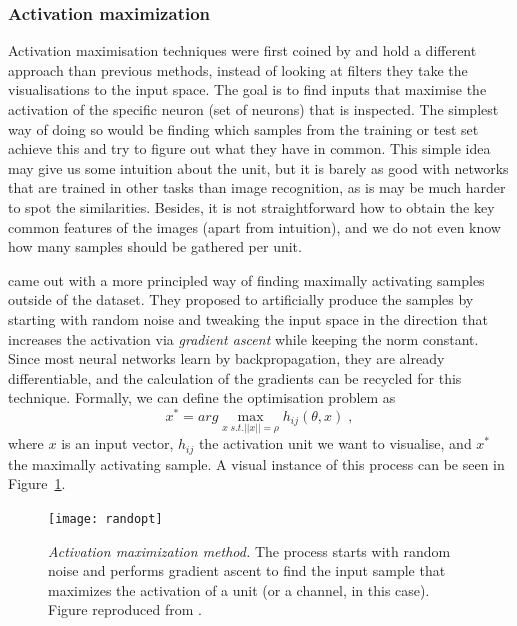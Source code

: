 \subsubsection*{Activation maximization} \label{sect:actmax}
Activation maximisation techniques were first coined by \cite{Erhan2009} and hold a different approach than previous methods, instead of looking at filters they take the visualisations to the input space. The goal is to find inputs that maximise the activation of the specific neuron (set of neurons) that is inspected. The simplest way of doing so would be finding which samples from the training or test set achieve this and try to figure out what they have in common. This simple idea may give us some intuition about the unit, but it is barely as good with networks that are trained in other tasks than image recognition, as is may be much harder to spot the similarities. Besides, it is not straightforward how to obtain the key common features of the images (apart from intuition), and we do not even know how many samples should be gathered per unit.

\cite{Erhan2009} came out with a more principled way of finding maximally activating samples outside of the dataset. They proposed to artificially produce the samples by starting with random noise and tweaking the input space in the direction that increases the activation via \textit{gradient ascent} while keeping the norm constant. Since most neural networks learn by backpropagation, they are already differentiable, and the calculation of the gradients can be recycled for this technique. Formally, we can define the optimisation problem as
\begin{equation}
x^* = arg \max\limits_{x \; s.t. ||x||=\rho} h_{ij}(\theta,x) \; ,
\label{eq:opt}
\end{equation}
where $x$ is an input vector, $h_{ij}$ the activation unit we want to visualise, and $x^*$ the maximally activating sample. A visual instance of this process can be seen in Figure~\ref{fig:randopt}.

\begin{figure}
	\centering
	\texttt{[image: randopt]}
	\caption{\textit{Activation maximization method.} The process starts with random noise and performs gradient ascent to find the input sample that maximizes the activation of a unit (or a channel, in this case). Figure reproduced from \cite{Olah2017}.}
	\label{fig:randopt}
\end{figure}

